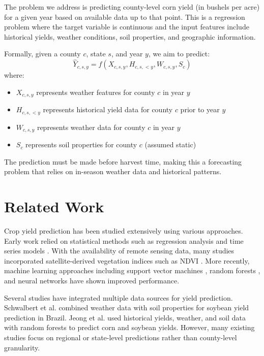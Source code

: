 \documentclass[conference]{IEEEtran}
\begin{document}
The problem we address is predicting county-level corn yield (in bushels per acre) for a given year based on available data up to that point. This is a regression problem where the target variable is continuous and the input features include historical yields, weather conditions, soil properties, and geographic information.

Formally, given a county $c$, state $s$, and year $y$, we aim to predict:
\begin{equation}
\hat{Y}_{c,s,y} = f(X_{c,s,y}, H_{c,s,<y}, W_{c,s,y}, S_c)
\end{equation}
where:
\begin{itemize}
    \item $X_{c,s,y}$ represents weather features for county $c$ in year $y$
    \item $H_{c,s,<y}$ represents historical yield data for county $c$ prior to year $y$
    \item $W_{c,s,y}$ represents weather data for county $c$ in year $y$
    \item $S_c$ represents soil properties for county $c$ (assumed static)
\end{itemize}

The prediction must be made before harvest time, making this a forecasting problem that relies on in-season weather data and historical patterns.

\section{Related Work}

Crop yield prediction has been studied extensively using various approaches. Early work relied on statistical methods such as regression analysis and time series models \cite{schlenker2009nonlinear}. With the availability of remote sensing data, many studies incorporated satellite-derived vegetation indices such as NDVI \cite{becker2019using}. More recently, machine learning approaches including support vector machines \cite{crane2011forecasting}, random forests \cite{jeong2016random}, and neural networks \cite{pantazi2016wheat} have shown improved performance.

Several studies have integrated multiple data sources for yield prediction. Schwalbert et al. \cite{schwalbert2020forecasting} combined weather data with soil properties for soybean yield prediction in Brazil. Jeong et al. \cite{jeong2016random} used historical yields, weather, and soil data with random forests to predict corn and soybean yields. However, many existing studies focus on regional or state-level predictions rather than county-level granularity.
\end{document}
